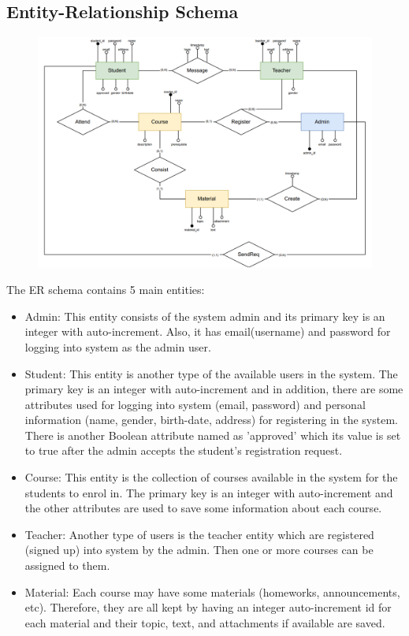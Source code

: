 \subsection{Entity-Relationship Schema}

 \begin{figure}[h!]
   \centering
   \includegraphics[width=17.7cm]{HW_1/images/FINAL-ER.png}
 \end{figure}
 
The ER schema contains 5 main entities:
 \begin{itemize}
  \item Admin: This entity consists of the system admin and its primary key is an integer with auto-increment. Also, it has email(username) and password for logging into system as the admin user.
  \item Student: This entity is another type of the available users in the system. The primary key is an integer with auto-increment and in addition, there are some attributes used for logging into system (email, password) and personal information (name, gender, birth-date, address) for registering in the system. There is another Boolean attribute named as 'approved' which its value is set to true after the admin accepts the student's registration request.
  \item Course: This entity is the collection of courses available in the system for the students to enrol in. The primary key is an integer with auto-increment and the other attributes are used to save some information about each course.
  \item Teacher: Another type of users is the teacher entity which are registered (signed up) into system by the admin. Then one or more courses can be assigned to them.
  \item Material: Each course may have some materials (homeworks, announcements, etc). Therefore, they are all kept by having an integer auto-increment id for each material and their topic, text, and attachments if available are saved.
 \end{itemize}